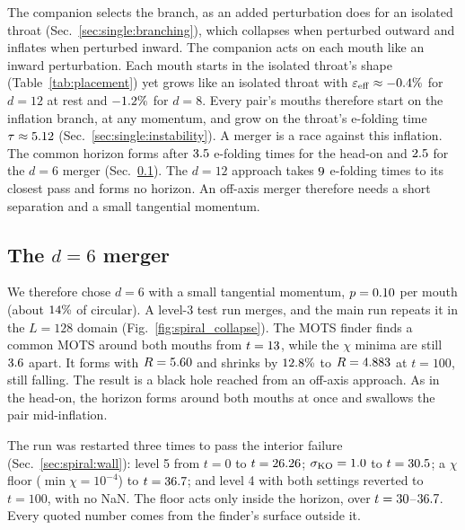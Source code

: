 \documentclass[twocolumn,floatfix,aps,prd,superscriptaddress,nofootinbib,showkeys]{revtex4-2}
\begin{document}
The companion selects the branch, as an added perturbation does for an isolated throat (Sec.~\ref{sec:single:branching}), which collapses when perturbed outward and inflates when perturbed inward. The companion acts on each mouth like an inward perturbation. Each mouth starts in the isolated throat's shape (Table~\ref{tab:placement}) yet grows like an isolated throat with $\varepsilon_{\rm eff}\approx-0.4\%$ for $d=12$ at rest and $-1.2\%$ for $d=8$. Every pair's mouths therefore start on the inflation branch, at any momentum, and grow on the throat's e-folding time $\tau\approx5.12$ (Sec.~\ref{sec:single:instability}). A merger is a race against this inflation. The common horizon forms after $3.5$ e-folding times for the head-on and $2.5$ for the $d=6$ merger (Sec.~\ref{sec:spiral:inspiral}). The $d=12$ approach takes $9$ e-folding times to its closest pass and forms no horizon. An off-axis merger therefore needs a short separation and a small tangential momentum.

\subsection{The $d=6$ merger}
\label{sec:spiral:inspiral}

We therefore chose $d=6$ with a small tangential momentum, $p=0.10$ per mouth (about $14\%$ of circular). A level-3 test run merges, and the main run repeats it in the $L=128$ domain (Fig.~\ref{fig:spiral_collapse}). The MOTS finder finds a common MOTS around both mouths from $t=13$, while the $\chi$ minima are still $3.6$ apart. It forms with $R=5.60$ and shrinks by $12.8\%$ to $R=4.883$ at $t=100$, still falling. The result is a black hole reached from an off-axis approach. As in the head-on, the horizon forms around both mouths at once and swallows the pair mid-inflation.

The run was restarted three times to pass the interior failure (Sec.~\ref{sec:spiral:wall}): level 5 from $t=0$ to $t=26.26$; $\sigma_{\rm KO}=1.0$ to $t=30.5$; a $\chi$ floor ($\min\chi=10^{-4}$) to $t=36.7$; and level 4 with both settings reverted to $t=100$, with no NaN. The floor acts only inside the horizon, over $t=30$--$36.7$. Every quoted number comes from the finder's surface outside it.
\end{document}
